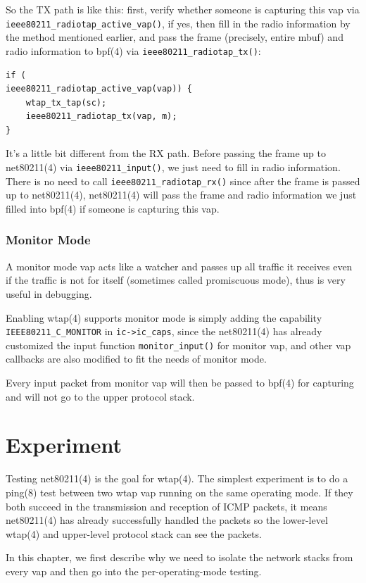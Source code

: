 \documentclass[conference]{IEEEtran}
\begin{document}
So the TX path is like this: first, verify whether someone is capturing this vap via \lstinline{ieee80211_radiotap_active_vap()}, if yes, then fill in the radio information by the method mentioned earlier, and pass the frame (precisely, entire mbuf) and radio information to bpf(4) via \lstinline{ieee80211_radiotap_tx()}:

\begin{lstlisting}
if (
ieee80211_radiotap_active_vap(vap)) {
    wtap_tx_tap(sc);
    ieee80211_radiotap_tx(vap, m);
}
\end{lstlisting}

It's a little bit different from the RX path. Before passing the frame up to net80211(4) via \lstinline{ieee80211_input()}, we just need to fill in radio information. There is no need to call \lstinline{ieee80211_radiotap_rx()} since after the frame is passed up to net80211(4), net80211(4) will pass the frame and radio information we just filled into bpf(4) if someone is capturing this vap.

\subsubsection{Monitor Mode}
A monitor mode vap acts like a watcher and passes up all traffic it receives even if the traffic is not for itself (sometimes called promiscuous mode), thus is very useful in debugging. 

Enabling wtap(4) supports monitor mode is simply adding the capability \lstinline{IEEE80211_C_MONITOR} in \lstinline{ic->ic_caps}, since the net80211(4) has already customized the input function \lstinline{monitor_input()} for monitor vap, and other vap callbacks are also modified to fit the needs of monitor mode. 

Every input packet from monitor vap will then be passed to bpf(4) for capturing and will not go to the upper protocol stack.

\section{Experiment}
Testing net80211(4) is the goal for wtap(4). The simplest experiment is to do a ping(8) test between two wtap vap running on the same operating mode. If they both succeed in the transmission and reception of ICMP packets, it means net80211(4) has already successfully handled the packets so the lower-level wtap(4) and upper-level protocol stack can see the packets.

In this chapter, we first describe why we need to isolate the network stacks from every vap and then go into the per-operating-mode testing.
\end{document}
